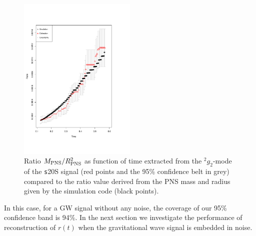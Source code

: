 \begin{figure}
 \centering
 \includegraphics[width=0.5\textwidth,height=0.3\textheight]{plots/ratio}
 \caption{Ratio $M_{\rm PNS}/R_{\rm PNS}^2$ as function of time extracted from the $\mbox{}^2 g_2$-mode of the {\texttt s20S} signal (red points and the 95\% confidence belt in grey) compared to the ratio value derived from the PNS mass and radius given by the simulation code (black points).} \label{fig:ratio}
\end{figure}


In this case, for a GW signal without any noise, the coverage of our 95\% confidence band is 94\%.
In the next section we investigate the performance of reconstruction of $r(t)$ when the gravitational wave
signal is embedded in noise.
